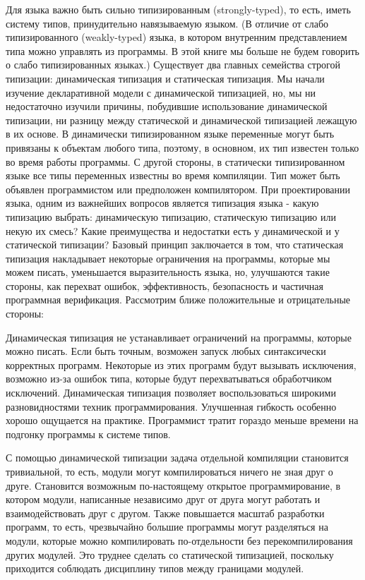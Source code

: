 Для языка важно быть сильно типизированным (strongly-typed), то есть, иметь систему типов, принудительно навязываемую языком. (В отличие от слабо типизированного (weakly-typed) языка, в котором внутренним представлением типа можно управлять из программы. В этой книге мы больше не будем говорить о слабо типизированных языках.) Существует два главных семейства строгой типизации: динамическая типизация и статическая типизация. Мы начали изучение декларативной модели с динамической типизацией, но, мы ни недостаточно изучили причины, побудившие использование динамической типизации, ни разницу между статической и динамической типизацией лежащую в их основе. В динамически типизированном языке переменные могут быть привязаны к объектам любого типа, поэтому, в основном, их тип известен только во время работы программы. С другой стороны, в статически типизированном языке все типы переменных известны во время компиляции. Тип может быть объявлен программистом или предположен компилятором. При проектировании языка, одним из важнейших вопросов является типизация языка - какую типизацию выбрать: динамическую типизацию, статическую типизацию или некую их смесь? Какие преимущества и недостатки есть у динамической и у статической типизации? Базовый принцип заключается в том, что статическая типизация накладывает некоторые ограничения на программы, которые мы можем писать, уменьшается выразительность языка, но, улучшаются такие стороны, как перехват ошибок, эффективность, безопасность и частичная программная верификация. Рассмотрим ближе положительные и отрицательные стороны:

Динамическая типизация не устанавливает ограничений на программы, которые можно писать. Если быть точным, возможен запуск любых синтаксически корректных программ. Некоторые из этих программ будут вызывать исключения, возможно из-за ошибок типа, которые будут перехватываться обработчиком исключений. Динамическая типизация позволяет воспользоваться широкими разновидностями техник программирования. Улучшенная гибкость особенно хорошо ощущается на практике. Программист тратит гораздо меньше времени на подгонку программы к системе типов.

С помощью динамической типизации задача отдельной компиляции становится тривиальной, то есть, модули могут компилироваться ничего не зная друг о друге. Становится возможным по-настоящему открытое программирование, в котором модули, написанные независимо друг от друга могут работать и взаимодействовать друг с другом. Также повышается масштаб разработки программ, то есть, чрезвычайно большие программы могут разделяться на модули, которые можно компилировать по-отдельности без перекомпилирования других модулей. Это труднее сделать со статической типизацией, поскольку приходится соблюдать дисциплину типов между границами модулей.

